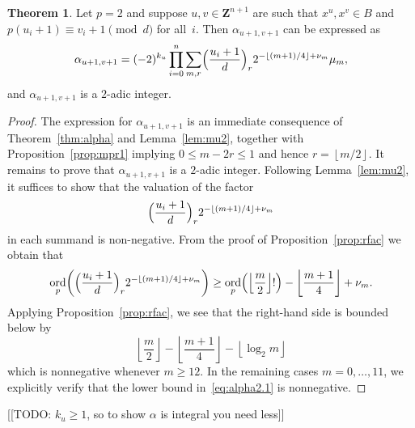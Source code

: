 \documentclass[a4paper,11pt]{article}
\numberwithin{equation}{section}
\providecommand{\floor}[1]{\left\lfloor#1\right\rfloor}   %
\newcommand{\ZZ}{\mathbf{Z}} %
\DeclareMathOperator{\ord}{ord}          %
\theoremstyle{definition}
\newtheorem{thm}{Theorem}[section]
\begin{document}
\begin{thm} \label{thm:alpha2}
Let $p = 2$ and suppose $u, v \in \ZZ^{n+1}$ are such that 
$x^u, x^v \in B$ and $p (u_i + 1) \equiv v_i + 1 \pmod{d}$ 
for all~$i$.  Then $\alpha_{u+1,v+1}$ can be expressed as 
\begin{equation} \label{eq:alpha2.0}
\alpha_{u+1,v+1} = (-2)^{k_u} \prod_{i=0}^n \sum_{m,r} 
    \Bigl(\frac{u_i+1}{d}\Bigr)_r 2^{-\floor{(m+1)/4}+\nu_m} \mu_m, 
\end{equation}
and $\alpha_{u+1,v+1}$ is a $2$-adic integer.
\end{thm}

\begin{proof}
The expression for $\alpha_{u+1,v+1}$ is an immediate consequence 
of Theorem~\ref{thm:alpha} and Lemma~\ref{lem:mu2}, together with 
Proposition~\ref{prop:mpr1} implying $0 \leq m - 2r \leq 1$ and 
hence $r = \floor{m/2}$.  It remains to prove that 
$\alpha_{u+1,v+1}$ is a $2$-adic integer.  Following Lemma~\ref{lem:mu2}, 
it suffices to show that the valuation of the factor 
\begin{equation}
\Bigl(\frac{u_i+1}{d}\Bigr)_r 2^{- \floor{(m+1)/4} + \nu_m}
\end{equation}
in each summand is non-negative.  From the proof of 
Proposition~\ref{prop:rfac} we obtain that 
\begin{equation} \label{eq:alpha2.1}
\ord_p \biggl( \Bigl(\frac{u_i+1}{d}\Bigr)_r 2^{- \floor{(m+1)/4} + \nu_m} \biggr)
\geq \ord_p\Bigl(\floor{\frac{m}{2}}!\Bigr) - \floor{\frac{m+1}{4}} + \nu_m.
\end{equation}
Applying Proposition~\ref{prop:rfac}, we see that the right-hand side 
is bounded below by 
\begin{equation}
\floor{\frac{m}{2}} - \floor{\frac{m+1}{4}} - \floor{\log_2 m}
\end{equation}
which is nonnegative whenever $m \geq 12$.  In the remaining 
cases $m = 0, \dotsc, 11$, we explicitly verify that the 
lower bound in~\eqref{eq:alpha2.1} is nonnegative.
\end{proof}

[[TODO: $k_u \geq 1$, so to show $\alpha$ is integral you need less]]
\end{document}
